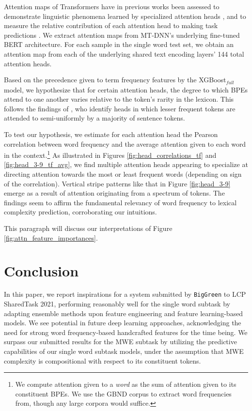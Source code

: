 \documentclass{dcthesis}
\theoremstyle{definition}
\theoremstyle{remark}
\begin{document}
Attention maps of Transformers have in previous works been assessed to demonstrate linguistic phenomena learned by specialized attention heads \citep{voita2019analyzing, clark2019does}, and to measure the relative contribution of each attention head to making task predictions \citep{voita2019analyzing, michel2019sixteen}. We extract attention maps from MT-DNN's underlying fine-tuned BERT architecture. For each sample in the single word test set, we obtain an attention map from each of the underlying shared text encoding layers' 144 total attention heads.

Based on the precedence given to term frequency features by the XGBoost$_\textit{full}$ model, we hypothesize that for certain attention heads, the degree to which BPEs attend to one another varies relative to the token's rarity in the lexicon. This follows the findings of \citealp{voita2019analyzing}, who identify heads in which lesser frequent tokens are attended to semi-uniformly by a majority of sentence tokens. 

To test our hypothesis, we estimate for each attention head the Pearson correlation between word frequency and the average attention given to each word in the context.\footnote{We compute attention given to a \textit{word} as the sum of attention given to its constituent BPEs. We use the GBND corpus to extract word frequencies from, though any large corpora would suffice.} As illustrated in Figures \ref{fig:head_correlations_tf} and \ref{fig:head_3-9_tf_avg}, we find multiple attention heads appearing to specialize at directing attention towards the most or least frequent words (depending on sign of the correlation). Vertical stripe patterns like that in Figure \ref{fig:head_3-9} emerge as a result of attention originating from a spectrum of tokens. The findings seem to affirm the fundamental relevancy of word frequency to lexical complexity prediction, corroborating our intuitions.

This paragraph will discuss our interpretations of Figure \ref{fig:attn_feature_importances}.

\chapter{Conclusion}

In this paper, we report inspirations for a system submitted by \texttt{BigGreen} to LCP SharedTask 2021, performing reasonably well for the single word subtask by adapting ensemble methods upon feature engineering and feature learning-based models. We see potential in future deep learning approaches, acknowledging the need for strong word frequency-based handcrafted features for the time being. We surpass our submitted results for the MWE subtask by utilizing the predictive capabilities of our single word subtask models, under the assumption that MWE complexity is compositional with respect to its constituent tokens.
\end{document}
